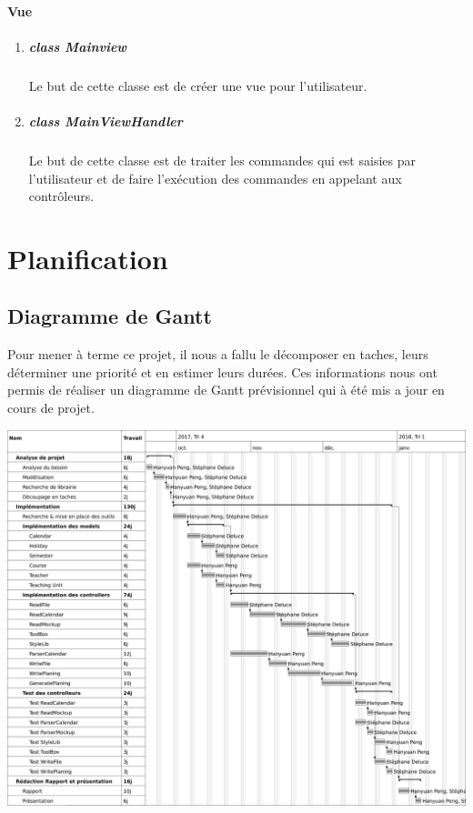 \documentclass{polytech/polytech}
\begin{document}
	\subsubsection{Vue}
	\begin{enumerate}
		\item \paragraph{class Mainview}
		Le but de cette classe est de créer une vue pour l'utilisateur.

		\item \paragraph{class MainViewHandler}
		Le but de cette classe est de traiter les commandes qui est saisies par l'utilisateur et de faire l'exécution des commandes en appelant aux contrôleurs.
	\end{enumerate}
	\chapter{Planification}

	\section{Diagramme de Gantt}

	Pour mener à terme ce projet, il nous a fallu le décomposer en taches, leurs déterminer une priorité et en estimer leurs durées. Ces informations nous ont permis de réaliser un diagramme de Gantt prévisionnel qui à été mis a jour en cours de projet.

	\includegraphics[width=\textwidth]{./img/Gantt.png}
\end{document}
